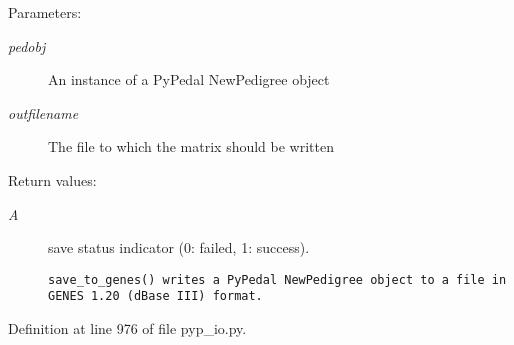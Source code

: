 \begin{Desc}
\item[Parameters:]
\begin{description}
\item[{\em pedobj}]An instance of a Py\-Pedal New\-Pedigree object \item[{\em outfilename}]The file to which the matrix should be written \end{description}
\end{Desc}
\begin{Desc}
\item[Return values:]
\begin{description}
\item[{\em A}]save status indicator (0: failed, 1: success).

\footnotesize\begin{verbatim}save_to_genes() writes a PyPedal NewPedigree object to a file in
GENES 1.20 (dBase III) format.
\end{verbatim}
\normalsize
 \end{description}
\end{Desc}


Definition at line 976 of file pyp\_\-io.py.